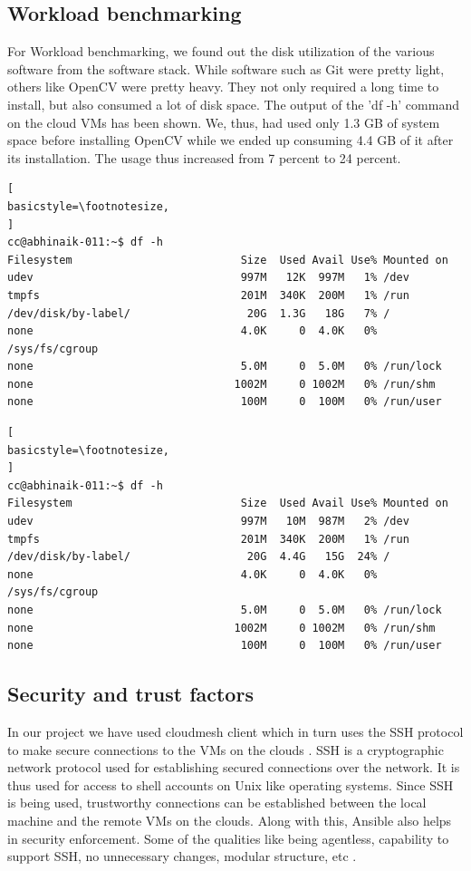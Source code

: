 \documentclass[9pt,twocolumn,twoside]{../../styles/osajnl}
\begin{document}
\subsection{Workload benchmarking}
For Workload benchmarking, we found out the disk utilization of the
various software from the software stack.  While software such as
Git were pretty light, others like OpenCV were pretty heavy.  They not
only required a long time to install, but also consumed a lot of disk
space.  The output of the 'df -h' command on the cloud VMs has been shown.  We, thus, had used only 1.3 GB of
system space before installing OpenCV while we ended up consuming 4.4
GB of it after its installation.  The usage thus increased from 7
percent to 24 percent.

\begin{lstlisting}[
basicstyle=\footnotesize,
]
cc@abhinaik-011:~$ df -h
Filesystem                          Size  Used Avail Use% Mounted on
udev                                997M   12K  997M   1% /dev
tmpfs                               201M  340K  200M   1% /run
/dev/disk/by-label/                  20G  1.3G   18G   7% /
none                                4.0K     0  4.0K   0% /sys/fs/cgroup
none                                5.0M     0  5.0M   0% /run/lock
none                               1002M     0 1002M   0% /run/shm
none                                100M     0  100M   0% /run/user
\end{lstlisting}

\begin{lstlisting}[
basicstyle=\footnotesize,
]
cc@abhinaik-011:~$ df -h
Filesystem                          Size  Used Avail Use% Mounted on
udev                                997M   10M  987M   2% /dev
tmpfs                               201M  340K  200M   1% /run
/dev/disk/by-label/                  20G  4.4G   15G  24% /
none                                4.0K     0  4.0K   0% /sys/fs/cgroup
none                                5.0M     0  5.0M   0% /run/lock
none                               1002M     0 1002M   0% /run/shm
none                                100M     0  100M   0% /run/user
\end{lstlisting}

\subsection{Security and trust factors}
In our project we have used cloudmesh client which in turn uses the
SSH protocol to make secure connections to the VMs on the clouds
\cite{ssh-security}.  SSH is a cryptographic network protocol used for
establishing secured connections over the network.  It is thus used
for access to shell accounts on Unix like operating systems.  Since
SSH is being used, trustworthy connections can be established between
the local machine and the remote VMs on the clouds.  Along with this,
Ansible also helps in security enforcement.  Some of the qualities
like being agentless, capability to support SSH, no unnecessary
changes, modular structure, etc \cite{ansible-security}.
\end{document}
